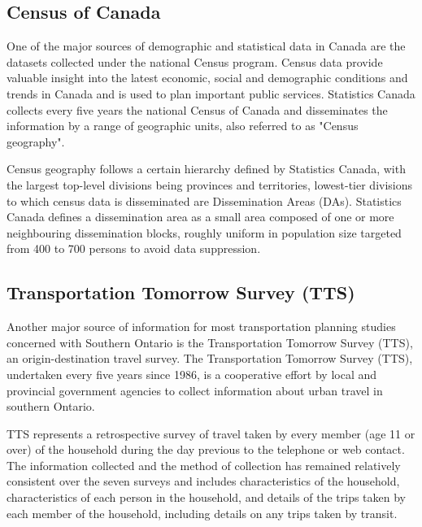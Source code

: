 \subsection{Census of Canada} \label{subsec:census_description}

One of the major sources of demographic and statistical data in Canada are the datasets collected under the national Census program.
Census data provide valuable insight into the latest economic, social and demographic conditions and trends in Canada and is used to plan important public services.
Statistics Canada collects every five years the national Census of Canada and disseminates the information by a range of geographic units, also referred to as "Census geography"\cite{MapandDataLibrary2019}.

Census geography follows a certain hierarchy defined by Statistics Canada, with the largest top-level divisions being provinces and territories, lowest-tier divisions to which census data is disseminated are Dissemination Areas (DAs)\cite{StatisticsCanada2018}.
Statistics Canada defines a dissemination area as a small area composed of one or more neighbouring dissemination blocks, roughly uniform in population size targeted from 400 to 700 persons to avoid data suppression\cite{StatisticsCanada2015}.

\subsection{Transportation Tomorrow Survey (TTS)} \label{subsec:tts_description}

Another major source of information for most transportation planning studies concerned with Southern Ontario is the Transportation Tomorrow Survey (TTS)\cite{DataManagementGroup2014}, an origin-destination travel survey.
The Transportation Tomorrow Survey (TTS), undertaken every five years since 1986, is a cooperative effort by local and provincial government agencies to collect information about urban travel in southern Ontario.

TTS represents a retrospective survey of travel taken by every member (age 11 or over) of the household during the day previous to the telephone or web contact.
The information collected and the method of collection has remained relatively consistent over the seven surveys and includes characteristics of the household, characteristics of each person in the household, and details of the trips taken by each member of the household, including details on any trips taken by transit\cite{Ashby2018}.

